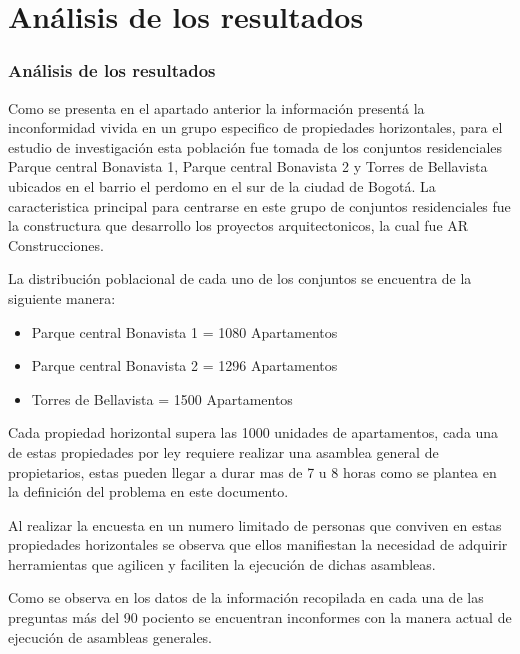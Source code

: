 \section{Análisis de los resultados}

\subsubsection{Análisis de los resultados}

Como se presenta en el apartado anterior la información presentá la inconformidad vivida en un grupo especifico de propiedades horizontales, para el estudio de investigación esta población fue tomada de los conjuntos residenciales Parque central Bonavista 1, Parque central Bonavista 2 y Torres de Bellavista ubicados en el barrio el perdomo en el sur de la ciudad de Bogotá. La caracteristica principal para centrarse en este grupo de conjuntos residenciales fue la constructura que desarrollo los proyectos arquitectonicos, la cual fue AR Construcciones.

\vspace{0.5cm}

La distribución poblacional de cada uno de los conjuntos se encuentra de la siguiente manera:

\begin{itemize}
	\item Parque central Bonavista 1 = 1080 Apartamentos
	
	\item Parque central Bonavista 2 = 1296 Apartamentos
	
	\item Torres de Bellavista = 1500 Apartamentos
\end{itemize}

Cada propiedad horizontal supera las 1000 unidades de apartamentos, cada una de estas propiedades por ley requiere realizar una asamblea general de propietarios, estas pueden llegar a durar mas de 7 u 8 horas como se plantea en la definición del problema en este documento.

Al realizar la encuesta en un numero limitado de personas que conviven en estas propiedades horizontales se observa que ellos manifiestan la necesidad de adquirir herramientas que agilicen y faciliten la ejecución de dichas asambleas. 

Como se observa en los datos de la información recopilada en cada una de las preguntas más del 90 pociento se encuentran inconformes con la manera actual de ejecución de asambleas generales.

